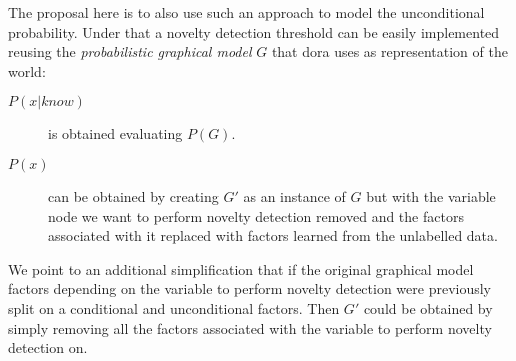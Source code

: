 \documentclass[a4paper]{article}
\begin{document}
The proposal here is to also use such an approach to model the unconditional
probability.
Under that a novelty detection threshold can be easily implemented
reusing the \emph{probabilistic graphical model} $G$ that dora uses as
representation of the world:
\begin{description}
\item[$P(x|know)$] is obtained evaluating $P(G)$.
\item[$P(x)$] can be obtained by creating $G'$ as an instance of $G$ but with the
variable node we want to perform novelty detection removed and the factors associated
with it replaced with factors learned from the unlabelled data.
\end{description}

We point to an additional simplification that if the original graphical model factors
depending on the variable to perform novelty detection were previously split on a
conditional and unconditional factors. Then $G'$ could be obtained by simply removing
all the factors associated with the variable to perform novelty detection on.


\cleardoublepage
{}
{}



\end{document}
